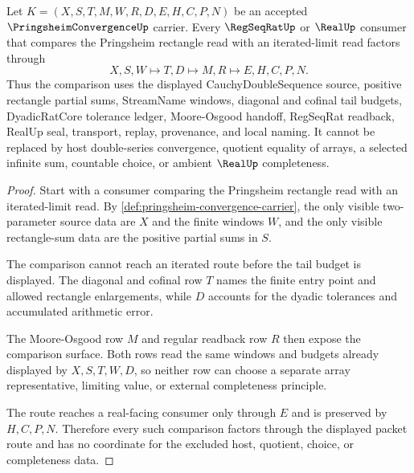 \begin{theorem}
\label{thm:pringsheim-convergence-iterated-limit-route}
Let $K=(X,S,T,M,W,R,D,E,H,C,P,N)$ be an accepted $\PringsheimConvergenceUp$ carrier. Every $\RegSeqRatUp$ or $\RealUp$ consumer that compares the Pringsheim rectangle read with an iterated-limit read factors through
$$
X,S,W \longmapsto T,D \longmapsto M,R \longmapsto E,H,C,P,N .
$$
Thus the comparison uses the displayed CauchyDoubleSequence source, positive rectangle partial sums, StreamName windows, diagonal and cofinal tail budgets, DyadicRatCore tolerance ledger, Moore-Osgood handoff, RegSeqRat readback, RealUp seal, transport, replay, provenance, and local naming. It cannot be replaced by host double-series convergence, quotient equality of arrays, a selected infinite sum, countable choice, or ambient $\RealUp$ completeness.
\end{theorem}
\begin{proof}
Start with a consumer comparing the Pringsheim rectangle read with an iterated-limit read. By \autoref{def:pringsheim-convergence-carrier}, the only visible two-parameter source data are $X$ and the finite windows $W$, and the only visible rectangle-sum data are the positive partial sums in $S$.

The comparison cannot reach an iterated route before the tail budget is displayed. The diagonal and cofinal row $T$ names the finite entry point and allowed rectangle enlargements, while $D$ accounts for the dyadic tolerances and accumulated arithmetic error.

The Moore-Osgood row $M$ and regular readback row $R$ then expose the comparison surface. Both rows read the same windows and budgets already displayed by $X,S,T,W,D$, so neither row can choose a separate array representative, limiting value, or external completeness principle.

The route reaches a real-facing consumer only through $E$ and is preserved by $H,C,P,N$. Therefore every such comparison factors through the displayed packet route and has no coordinate for the excluded host, quotient, choice, or completeness data.
\end{proof}

